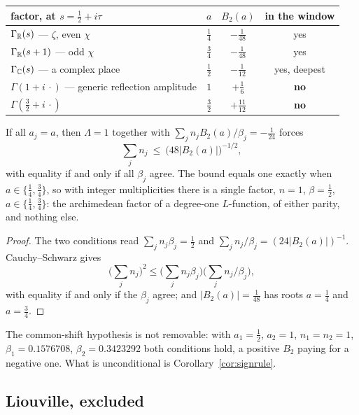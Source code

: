 \begin{center}
\begin{tabular}{@{}lccc@{}}
\toprule
factor, at $s=\frac12+i\tau$ & $a$ & $B_2(a)$ & in the window\\
\midrule
$\Gamma_\mathbb R(s)$ --- $\zeta$, even $\chi$ & $\frac14$ & $-\frac1{48}$ & yes\\
$\Gamma_\mathbb R(s+1)$ --- odd $\chi$ & $\frac34$ & $-\frac1{48}$ & yes\\
$\Gamma_\mathbb C(s)$ --- a complex place & $\frac12$ & $-\frac1{12}$ & yes, deepest\\
$\Gamma(1+i\,\cdot)$ --- generic reflection amplitude & $1$ & $+\frac16$ & \textbf{no}\\
$\Gamma(\frac32+i\,\cdot)$ & $\frac32$ & $+\frac{11}{12}$ & \textbf{no}\\
\bottomrule
\end{tabular}
\end{center}

\begin{proposition}\label{prop:rigidity}
If all $a_j=a$, then $\Lambda=1$ together with
$\sum_jn_jB_2(a)/\beta_j=-\frac1{24}$ forces
\[
 \sum_jn_j\ \leq\ \big(48|B_2(a)|\big)^{-1/2},
\]
with equality if and only if all $\beta_j$ agree. The bound equals one exactly
when $a\in\{\frac14,\frac34\}$, so with integer multiplicities there is a single
factor, $n=1$, $\beta=\frac12$, $a\in\{\frac14,\frac34\}$: the archimedean factor
of a degree-one $L$-function, of either parity, and nothing else.
\end{proposition}

\begin{proof}
The two conditions read $\sum_jn_j\beta_j=\frac12$ and
$\sum_jn_j/\beta_j=(24|B_2(a)|)^{-1}$. Cauchy--Schwarz gives
\[
 \Big(\sum_jn_j\Big)^2\leq\Big(\sum_jn_j\beta_j\Big)\Big(\sum_jn_j/\beta_j\Big),
\]
with equality if and only if the $\beta_j$ agree; and $|B_2(a)|=\frac1{48}$ has
roots $a=\frac14$ and $a=\frac34$.
\end{proof}

The common-shift hypothesis is not removable: with $a_1=\frac12$, $a_2=1$,
$n_1=n_2=1$, $\beta_1=0.1576708$, $\beta_2=0.3423292$ both conditions hold, a
positive $B_2$ paying for a negative one. What is unconditional is
Corollary~\ref{cor:signrule}.

\subsection{Liouville, excluded}

